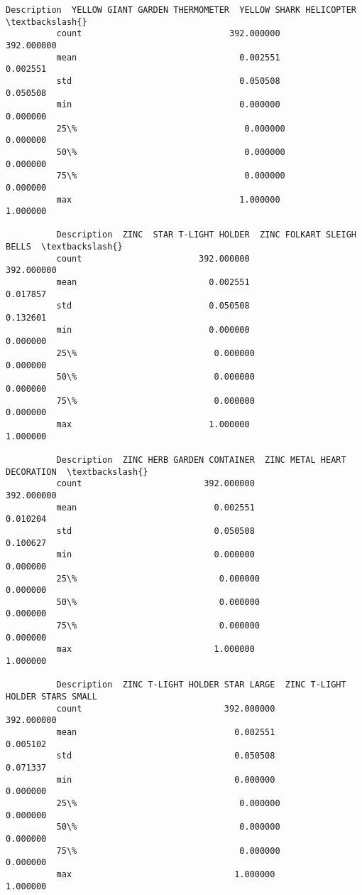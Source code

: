 \documentclass[11pt]{article}
\begin{document}
\begin{Verbatim}[commandchars=\\\{\}]
          Description  YELLOW GIANT GARDEN THERMOMETER  YELLOW SHARK HELICOPTER  \textbackslash{}
          count                             392.000000               392.000000   
          mean                                0.002551                 0.002551   
          std                                 0.050508                 0.050508   
          min                                 0.000000                 0.000000   
          25\%                                 0.000000                 0.000000   
          50\%                                 0.000000                 0.000000   
          75\%                                 0.000000                 0.000000   
          max                                 1.000000                 1.000000   
          
          Description  ZINC  STAR T-LIGHT HOLDER  ZINC FOLKART SLEIGH BELLS  \textbackslash{}
          count                       392.000000                 392.000000   
          mean                          0.002551                   0.017857   
          std                           0.050508                   0.132601   
          min                           0.000000                   0.000000   
          25\%                           0.000000                   0.000000   
          50\%                           0.000000                   0.000000   
          75\%                           0.000000                   0.000000   
          max                           1.000000                   1.000000   
          
          Description  ZINC HERB GARDEN CONTAINER  ZINC METAL HEART DECORATION  \textbackslash{}
          count                        392.000000                   392.000000   
          mean                           0.002551                     0.010204   
          std                            0.050508                     0.100627   
          min                            0.000000                     0.000000   
          25\%                            0.000000                     0.000000   
          50\%                            0.000000                     0.000000   
          75\%                            0.000000                     0.000000   
          max                            1.000000                     1.000000   
          
          Description  ZINC T-LIGHT HOLDER STAR LARGE  ZINC T-LIGHT HOLDER STARS SMALL  
          count                            392.000000                       392.000000  
          mean                               0.002551                         0.005102  
          std                                0.050508                         0.071337  
          min                                0.000000                         0.000000  
          25\%                                0.000000                         0.000000  
          50\%                                0.000000                         0.000000  
          75\%                                0.000000                         0.000000  
          max                                1.000000                         1.000000  
          

\end{Verbatim}
\end{document}

